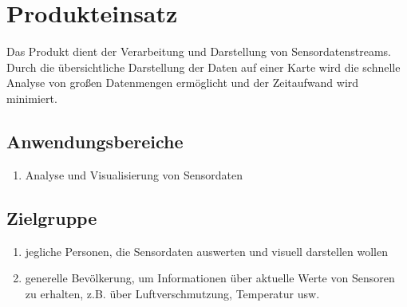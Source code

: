 \chapter{Produkteinsatz}
Das Produkt dient der Verarbeitung und Darstellung von Sensordatenstreams. Durch die übersichtliche Darstellung der Daten auf einer Karte wird die schnelle Analyse von großen Datenmengen ermöglicht und der Zeitaufwand wird minimiert.
\section{Anwendungsbereiche}
\begin{enumerate}
	\item Analyse und Visualisierung von Sensordaten
\end{enumerate}
\section{Zielgruppe}
\begin{enumerate}
	\item jegliche Personen, die Sensordaten auswerten und visuell darstellen wollen
	\item generelle Bevölkerung, um Informationen über aktuelle Werte von Sensoren zu erhalten, z.B. über Luftverschmutzung, Temperatur usw.
\end{enumerate}
